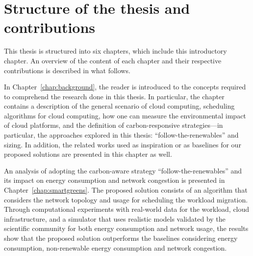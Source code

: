 \section{Structure of the thesis and contributions}

This thesis is structured into six chapters, which include this introductory chapter. An overview of the content of each chapter and their respective contributions is described in what follows.

In Chapter~\ref{chap:background}, the reader is introduced to the concepts required to comprehend the research done in this thesis. In particular, the chapter contains a description of the general scenario of cloud computing, scheduling algorithms for cloud computing, how one can measure the environmental impact of cloud platforms, and the definition of carbon-responsive strategies---in particular, the approaches explored in this thesis: ``follow-the-renewables'' and sizing. In addition, the related works used as inspiration or as baselines for our proposed solutions are presented in this chapter as well.

An analysis of adopting the carbon-aware strategy ``follow-the-renewables'' and its impact on energy consumption and network congestion is presented in Chapter~\ref{chap:smartgreens}. The proposed solution consists of an algorithm that considers the network topology and usage for scheduling the workload migration. Through computational experiments with real-world data for the workload, cloud infrastructure, and a simulator that uses realistic models validated by the scientific community for both energy consumption and network usage, the results show that the proposed solution outperforms the baselines considering energy consumption, non-renewable energy consumption and network congestion.

